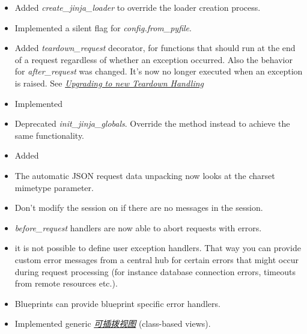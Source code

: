 \documentclass[a4paper,12pt]{sphinxmanual}
\begin{document}
\begin{itemize}
\item {} 
Added \emph{create\_jinja\_loader} to override the loader creation process.

\item {} 
Implemented a silent flag for \emph{config.from\_pyfile}.

\item {} 
Added \emph{teardown\_request} decorator, for functions that should run at the end
of a request regardless of whether an exception occurred.  Also the behavior
for \emph{after\_request} was changed.  It's now no longer executed when an exception
is raised.  See {\hyperref[upgrading:upgrading-to-new-teardown-handling]{\emph{Upgrading to new Teardown Handling}}}

\item {} 
Implemented {\hyperref[api:flask.has_request_context]{}}

\item {} 
Deprecated \emph{init\_jinja\_globals}.  Override the
{\hyperref[api:flask.Flask.create_jinja_environment]{}} method instead to
achieve the same functionality.

\item {} 
Added {\hyperref[api:flask.safe_join]{}}

\item {} 
The automatic JSON request data unpacking now looks at the charset
mimetype parameter.

\item {} 
Don't modify the session on {\hyperref[api:flask.get_flashed_messages]{}} if there
are no messages in the session.

\item {} 
\emph{before\_request} handlers are now able to abort requests with errors.

\item {} 
it is not possible to define user exception handlers.  That way you can
provide custom error messages from a central hub for certain errors that
might occur during request processing (for instance database connection
errors, timeouts from remote resources etc.).

\item {} 
Blueprints can provide blueprint specific error handlers.

\item {} 
Implemented generic {\hyperref[views:views]{\emph{可插拨视图}}} (class-based views).

\end{itemize}
\end{document}
